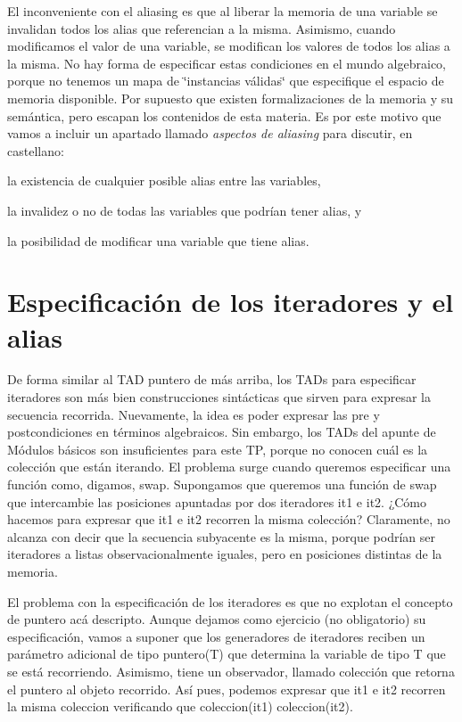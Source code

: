 El inconveniente con el aliasing es que al liberar la memoria de una variable se invalidan todos los alias que referencian a la misma. Asimismo, cuando modificamos el valor de una variable, se modifican los valores de todos los alias a la misma. No hay forma de especificar estas condiciones en el mundo algebraico, porque no tenemos un mapa de \char`\"{}instancias válidas\char`\"{} que especifique el espacio de memoria disponible. Por supuesto que existen formalizaciones de la memoria y su semántica, pero escapan los contenidos de esta materia. Es por este motivo que vamos a incluir un apartado llamado {\itshape aspectos de aliasing} para discutir, en castellano\+:
\begin{DoxyItemize}
\item la existencia de cualquier posible alias entre las variables,
\item la invalidez o no de todas las variables que podrían tener alias, y
\item la posibilidad de modificar una variable que tiene alias.
\end{DoxyItemize}\hypertarget{Aliasing_sec-iteradores}{}\section{Especificación de los iteradores y el alias}\label{Aliasing_sec-iteradores}
De forma similar al T\+AD puntero de más arriba, los T\+A\+Ds para especificar iteradores son más bien construcciones sintácticas que sirven para expresar la secuencia recorrida. Nuevamente, la idea es poder expresar las pre y postcondiciones en términos algebraicos. Sin embargo, los T\+A\+Ds del apunte de Módulos básicos son insuficientes para este TP, porque no conocen cuál es la colección que están iterando. El problema surge cuando queremos especificar una función como, digamos, swap. Supongamos que queremos una función de swap que intercambie las posiciones apuntadas por dos iteradores {\ttfamily it1} e {\ttfamily it2}. ¿\+Cómo hacemos para expresar que {\ttfamily it1} e {\ttfamily it2} recorren la misma colección? Claramente, no alcanza con decir que la secuencia subyacente es la misma, porque podrían ser iteradores a listas observacionalmente iguales, pero en posiciones distintas de la memoria.

El problema con la especificación de los iteradores es que no explotan el concepto de puntero acá descripto. Aunque dejamos como ejercicio (no obligatorio) su especificación, vamos a suponer que los generadores de iteradores reciben un parámetro adicional de tipo puntero(\+T) que determina la variable de tipo T que se está recorriendo. Asimismo, tiene un observador, llamado colección que retorna el puntero al objeto recorrido. Así pues, podemos expresar que {\ttfamily it1} e {\ttfamily it2} recorren la misma coleccion verificando que coleccion({\ttfamily it1})  coleccion({\ttfamily it2}). 